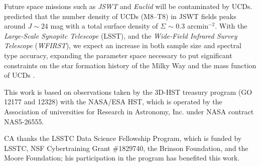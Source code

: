 \documentclass[manuscript]{aastex63}
\begin{document}
Future space missions such as \textit{JSWT} and \textit{Euclid} will be contaminated by UCDs. \cite{2016AJ....151...92R} predicted that the number density of UCDs (M8--T8) in JSWT fields peaks around $J\sim24$ mag with a total surface density of $\Sigma$ $\sim$ 0.3 arcmin$^{-2}$.  With the \textit{Large-Scale Synopitc Telescope} (LSST), and the \textit{Wide-Field Infrared Survey Telescope} (\textit{WFIRST}), we expect an increase in both sample size and spectral type accuracy, expanding the parameter space necessary to put significant constraints on the star formation history of the Milky Way and the mass function of UCDs \citep{LSSTScienceCollaboration2009,Spergel2015}.



\acknowledgements
This work is based on observations taken by the 3D-HST treasury program (GO 12177 and 12328) with the NASA/ESA HST, which is operated by the Association of universities for Research in Astronomy, Inc. under NASA contract NAS5-26555.

CA thanks the LSSTC Data Science Fellowship Program, which is funded by LSSTC, NSF Cybertraining Grant \#1829740, the Brinson Foundation, and the Moore Foundation; his participation in the program has benefited this work.


\clearpage


\end{document}
